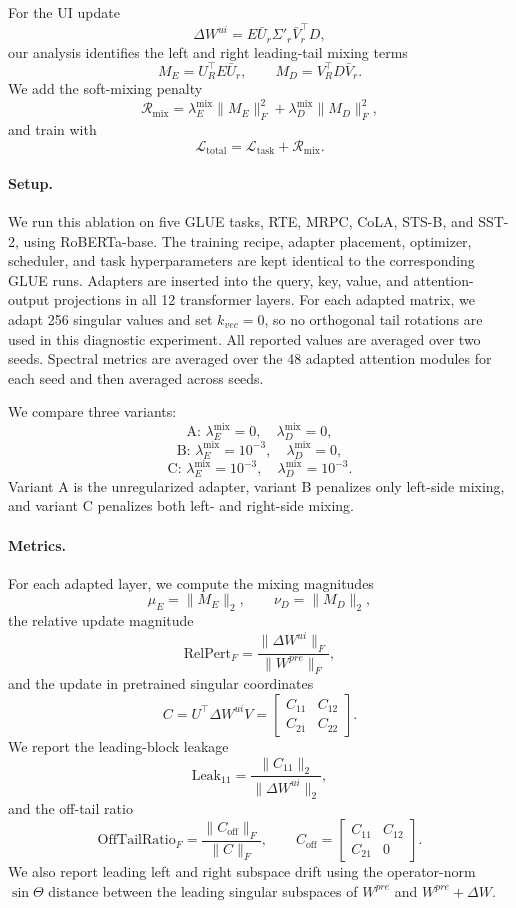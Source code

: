 For the UI update
\[
\Delta W^{ui}
=
E \bar{U}_r \Sigma'_r \bar{V}_r^\top D,
\]
our analysis identifies the left and right leading-tail mixing terms
\[
M_E = U_R^\top E \bar{U}_r,
\qquad
M_D = V_R^\top D \bar{V}_r.
\]
We add the soft-mixing penalty
\[
\mathcal{R}_{\mathrm{mix}}
=
\lambda_E^{\mathrm{mix}}\|M_E\|_F^2
+
\lambda_D^{\mathrm{mix}}\|M_D\|_F^2,
\]
and train with
\[
\mathcal{L}_{\mathrm{total}}
=
\mathcal{L}_{\mathrm{task}}
+
\mathcal{R}_{\mathrm{mix}}.
\]

\paragraph{Setup.}
We run this ablation on five GLUE tasks, RTE, MRPC, CoLA, STS-B, and
SST-2, using RoBERTa-base. The training recipe, adapter placement,
optimizer, scheduler, and task hyperparameters are kept identical to the
corresponding GLUE runs. Adapters are inserted into the query, key, value, and
attention-output projections in all 12 transformer layers. For each adapted
matrix, we adapt 256 singular values and set \(k_{vec}=0\), so no orthogonal
tail rotations are used in this diagnostic experiment. All reported values are averaged over two seeds. Spectral metrics are averaged over the 48 adapted attention
modules for each seed and then averaged across seeds.

We compare three variants:
\[
\text{A: } \lambda_E^{\mathrm{mix}}=0,\quad \lambda_D^{\mathrm{mix}}=0,
\]
\[
\text{B: } \lambda_E^{\mathrm{mix}}=10^{-3},\quad
\lambda_D^{\mathrm{mix}}=0,
\]
\[
\text{C: } \lambda_E^{\mathrm{mix}}=10^{-3},\quad
\lambda_D^{\mathrm{mix}}=10^{-3}.
\]
Variant A is the unregularized adapter, variant B penalizes only left-side
mixing, and variant C penalizes both left- and right-side mixing.

\paragraph{Metrics.}
For each adapted layer, we compute the mixing magnitudes
\[
\mu_E = \|M_E\|_2,
\qquad
\nu_D = \|M_D\|_2,
\]
the relative update magnitude
\[
\mathrm{RelPert}_F =
\frac{\|\Delta W^{ui}\|_F}{\|W^{pre}\|_F},
\]
and the update in pretrained singular coordinates
\[
C = U^\top \Delta W^{ui} V
=
\begin{bmatrix}
C_{11} & C_{12}\\
C_{21} & C_{22}
\end{bmatrix}.
\]
We report the leading-block leakage
\[
\mathrm{Leak}_{11}
=
\frac{\|C_{11}\|_2}{\|\Delta W^{ui}\|_2},
\]
and the off-tail ratio
\[
\mathrm{OffTailRatio}_F
=
\frac{\|C_{\mathrm{off}}\|_F}{\|C\|_F},
\qquad
C_{\mathrm{off}}
=
\begin{bmatrix}
C_{11} & C_{12}\\
C_{21} & 0
\end{bmatrix}.
\]
We also report leading left and right subspace drift using the operator-norm
\(\sin\Theta\) distance between the leading singular subspaces of
\(W^{pre}\) and \(W^{pre}+\Delta W\).


